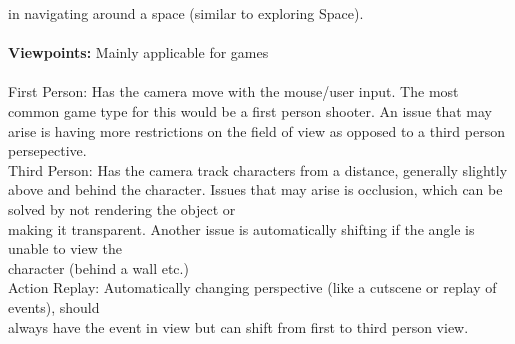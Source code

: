 \documentclass[a4paper,10pt]{article}
\begin{document}
\indent in navigating around a space (similar to exploring Space). \\ \\
\noindent \textcolor{Emerald}{\textbf{Viewpoints:}} Mainly applicable for games \\\\
\indent \textcolor{Emerald}{First Person:} Has the camera move with the mouse/user input. The most common game type 
\indent for this would be a first person shooter. An issue that may arise is having more restrictions on the 
\indent field of view as opposed to a third person persepective. \\
\indent \textcolor{Emerald}{Third Person:} Has the camera track characters from a distance, generally slightly above and behind \indent the character. Issues that may arise is occlusion, which can be solved by not rendering the object or \\
\indent making it transparent. Another issue is automatically shifting if the angle is unable to view the \\ 
\indent character (behind a wall etc.) \\
\indent \textcolor{Emerald}{Action Replay:} Automatically changing perspective (like a cutscene or replay of events), should \\ \indent always have the event in view but can shift from first to third person view. \\ \\
\end{document}
